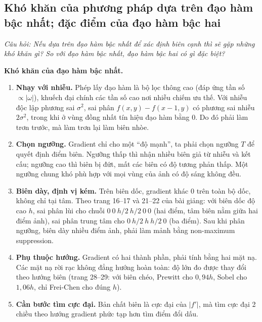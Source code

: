 \subsection{Khó khăn của phương pháp dựa trên đạo hàm bậc nhất; đặc điểm của đạo hàm bậc hai}
\label{subsec:w6_derivative_difficulty}

\textit{Câu hỏi: Nếu dựa trên đạo hàm bậc nhất để xác định biên cạnh thì sẽ gặp những khó khăn gì? So với đạo hàm bậc nhất, đạo hàm bậc hai có gì đặc biệt?}

\textbf{Khó khăn của đạo hàm bậc nhất.}
\begin{enumerate}
    \item \textbf{Nhạy với nhiễu.} Phép lấy đạo hàm là bộ lọc thông cao (đáp ứng tần số $\propto |\omega|$), khuếch đại chính các tần số cao nơi nhiễu chiếm ưu thế. Với nhiễu độc lập phương sai $\sigma^2$, sai phân $f(x, y) - f(x - 1, y)$ có phương sai nhiễu $2\sigma^2$, trong khi ở vùng đồng nhất tín hiệu đạo hàm bằng $0$. Do đó phải làm trơn trước, mà làm trơn lại làm biên nhòe.
    \item \textbf{Chọn ngưỡng.} Gradient chỉ cho một ``độ mạnh'', ta phải chọn ngưỡng $T$ để quyết định điểm biên. Ngưỡng thấp thì nhận nhiều biên giả từ nhiễu và kết cấu; ngưỡng cao thì biên bị đứt, mất các biên có độ tương phản thấp. Một ngưỡng chung khó phù hợp với mọi vùng của ảnh có độ sáng không đều.
    \item \textbf{Biên dày, định vị kém.} Trên biên dốc, gradient khác $0$ trên toàn bộ dốc, không chỉ tại tâm. Theo trang 16--17 và 21--22 của bài giảng: với biên dốc độ cao $h$, sai phân lùi cho chuỗi $0\ 0\ h/2\ h/2\ 0\ 0$ (hai điểm, tâm biên nằm giữa hai điểm ảnh), sai phân trung tâm cho $0\ h/2\ h\ h/2\ 0$ (ba điểm). Sau khi phân ngưỡng, biên dày nhiều điểm ảnh, phải làm mảnh bằng non-maximum suppression.
    \item \textbf{Phụ thuộc hướng.} Gradient có hai thành phần, phải tính bằng hai mặt nạ. Các mặt nạ rời rạc không đẳng hướng hoàn toàn: độ lớn đo được thay đổi theo hướng biên (trang 28--29: với biên chéo, Prewitt cho $0{,}94h$, Sobel cho $1{,}06h$, chỉ Frei-Chen cho đúng $h$).
    \item \textbf{Cần bước tìm cực đại.} Bản chất biên là cực đại của $|f'|$, mà tìm cực đại 2 chiều theo hướng gradient phức tạp hơn tìm điểm đổi dấu.
\end{enumerate}

